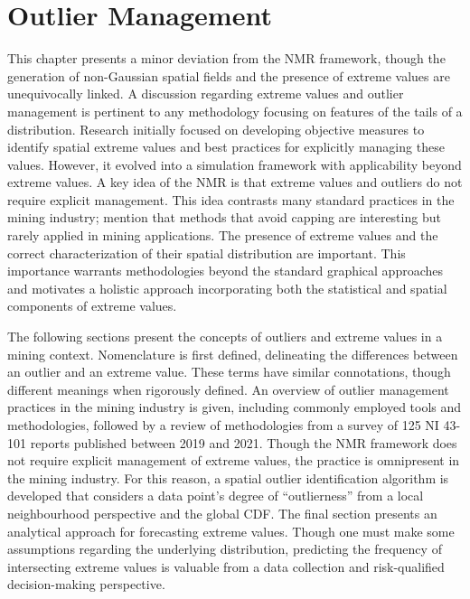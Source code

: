 
\chapter{Outlier Management}
\label{ch:02outlier}

This chapter presents a minor deviation from the \gls{NMR} framework, though the generation of non-Gaussian spatial fields and the presence of extreme values are unequivocally linked. A discussion regarding extreme values and outlier management is pertinent to any methodology focusing on features of the tails of a distribution. Research initially focused on developing objective measures to identify spatial extreme values and best practices for explicitly managing these values. However, it evolved into a simulation framework with applicability beyond extreme values. A key idea of the \gls{NMR} is that extreme values and outliers do not require explicit management. This idea contrasts many standard practices in the mining industry; \cite{dutaut2021new} mention that methods that avoid capping are interesting but rarely applied in mining applications. The presence of extreme values and the correct characterization of their spatial distribution are important. This importance warrants methodologies beyond the standard graphical approaches \citep{silva2021classification} and motivates a holistic approach incorporating both the statistical and spatial components of extreme values.

The following sections present the concepts of outliers and extreme values in a mining context. Nomenclature is first defined, delineating the differences between an outlier and an extreme value. These terms have similar connotations, though different meanings when rigorously defined. An overview of outlier management practices in the mining industry is given, including commonly employed tools and methodologies, followed by a review of methodologies from a survey of 125 \gls{NI} 43-101 reports published between 2019 and 2021. Though the \gls{NMR} framework does not require explicit management of extreme values, the practice is omnipresent in the mining industry. For this reason, a spatial outlier identification algorithm is developed that considers a data point's degree of ``outlierness'' from a local neighbourhood perspective and the global \gls{CDF}. The final section presents an analytical approach for forecasting extreme values. Though one must make some assumptions regarding the underlying distribution, predicting the frequency of intersecting extreme values is valuable from a data collection and risk-qualified decision-making perspective.

